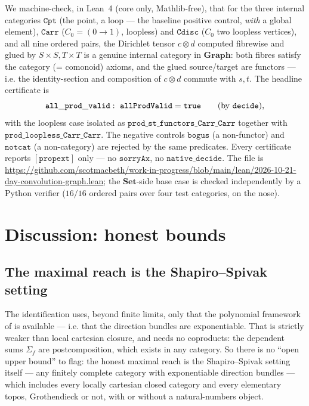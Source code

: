 \documentclass[11pt]{amsart}
\theoremstyle{plain}
\theoremstyle{definition}
\theoremstyle{remark}
\newcommand{\Set}{\mathbf{Set}}
\newcommand{\Graph}{\mathbf{Graph}}
\begin{document}
We machine-check, in Lean~4 (core only, Mathlib-free), that for the three internal categories
$\mathtt{Cpt}$ (the point, a loop --- the baseline positive control, \emph{with} a global element),
$\mathtt{Carr}$ ($C_0=(0\to1)$, loopless) and $\mathtt{Cdisc}$ ($C_0$ two loopless vertices), and all
nine ordered pairs, the Dirichlet tensor $c\otimes d$ computed fibrewise and glued by
$S\times S,T\times T$ is a genuine internal category in $\Graph$: both fibres satisfy the
category (= comonoid) axioms, and the glued source/target are functors --- i.e. the identity-section
and composition of $c\otimes d$ commute with $s,t$. The headline certificate is
\[
  \mathtt{all\_prod\_valid}:\ \mathtt{allProdValid}=\mathtt{true}
  \qquad(\text{by \texttt{decide}}),
\]
with the loopless case isolated as $\mathtt{prod\_st\_functors\_Carr\_Carr}$ together with
$\mathtt{prod\_loopless\_Carr\_Carr}$. The negative controls $\mathtt{bogus}$ (a non-functor) and
$\mathtt{notcat}$ (a non-category) are rejected by the same predicates. Every certificate reports
$\mathtt{[propext]}$ only --- no $\mathtt{sorryAx}$, no $\mathtt{native\_decide}$. The file is
\url{https://github.com/scotmacbeth/work-in-progress/blob/main/lean/2026-10-21-day-convolution-graph.lean};
the $\Set$-side base case is checked independently by a Python verifier ($16/16$ ordered pairs over
four test categories, on the nose).

\section{Discussion: honest bounds}\label{sec:discussion}

\subsection*{The maximal reach is the Shapiro--Spivak setting}
The identification uses, beyond finite limits, only that the polynomial framework of
\cite{ShapiroSpivak2023} is available --- i.e. that the direction bundles are exponentiable. That is
strictly weaker than local cartesian closure, and needs no coproducts: the dependent sums $\Sigma_f$
are postcomposition, which exists in any category. So there is no ``open upper bound'' to flag: the
honest maximal reach is the Shapiro--Spivak setting itself --- any finitely complete category with
exponentiable direction bundles --- which includes every locally cartesian closed category and every
elementary topos, Grothendieck or not, with or without a natural-numbers object.
\end{document}
